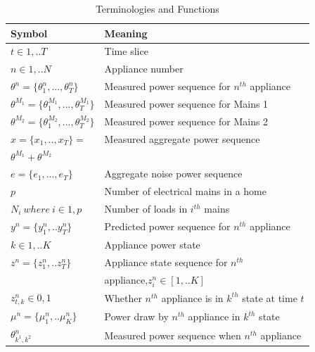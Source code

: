 \documentclass[conference]{IEEEtran}
\begin{document}
\begin{table}[ht!]
\vspace{-12pt}
\caption{Terminologies and Functions}
\vspace{-10pt}
\label{tab:terms}
\begin{tabular}{|l|l|}
\hline
Symbol&Meaning\\[0.1cm]
\hline
$t\in {1,..T}$& Time slice\\[0.1cm]
\hline
$n\in{1,..N}$ & Appliance number\\[0.1cm]
\hline
$\theta^n=\{\theta_1^n,...,\theta_T^n\}$ & Measured power sequence for $n^{th}$ appliance\\[0.1cm]
\hline
$\theta^{M_1}=\{\theta_1^{M_1},...,\theta_T^{M_1}\}$ & Measured power sequence for Mains 1\\[0.1cm]
\hline
$\theta^{M_2}=\{\theta_1^{M_2},...,\theta_T^{M_2}\}$ & Measured power sequence for Mains 2\\[0.1cm]
\hline
$x=\{ x_1,..,x_T\}=$ & Measured aggregate power sequence\\[0.1cm]
$\theta^{M_1}+\theta^{M_2}$ &\\[0.1cm]
\hline
$e=\{e_1,...,e_T\}$ & Aggregate noise power sequence\\[0.1cm]
\hline
$p$ & Number of electrical mains in a home\\[0.1cm]
\hline
$N_i \:where\:i \in {1,p}$ & Number of loads in $i^{th}$ mains\\[0.1cm]
\hline
$y^n=\{y_1^n,..y_T^n\}$ & Predicted power sequence for $n^{th}$ appliance\\[0.1cm]
\hline
$k\in {1,..K}$ & Appliance power state\\[0.1cm]
\hline
$z^n=\{z_1^n,..z_T^n\}$ & Appliance state sequence for $n^{th}$ \\[0.1cm]
& appliance,$z_i^n \in [1,..K]$\\[0.1cm]
\hline
$z_{t,k}^n \in{0,1}$ & Whether $n^{th}$ appliance is in $k^{th}$ state at time $t$\\[0.1cm]
\hline 
$\mu^n=\{\mu_1^n,..\mu_K^n\}$ & Power draw by $n^{th}$ appliance in $k^{th}$ state\\[0.1cm]
\hline
$\theta^n_{k^1,k^2}$& Measured power sequence when $n^{th}$ appliance \\[0.1cm]

\end{tabular}
\end{table}
\end{document}

